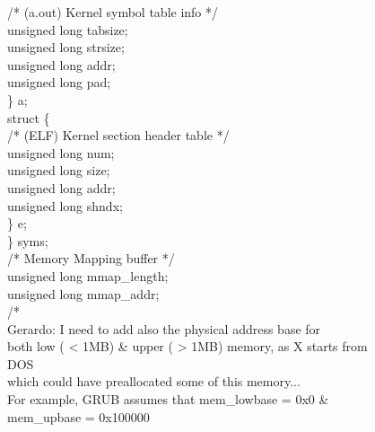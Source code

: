 \documentclass[a4paper]{report}
\begin{document}
\begin{figure}
\begin{tt}
\begin{tabbing}
/* (a.out) Kernel symbol table info */                                  \\
\>      \>      \>      unsigned long tabsize;                          \\
\>      \>      \>      unsigned long strsize;                          \\
\>      \>      \>      unsigned long addr;                             \\
\>      \>      \>      unsigned long pad;                              \\
\>      \>      \} a;                                                   \\
\>      \>      struct \{                                               \\
/* (ELF) Kernel section header table */                                 \\
\>      \>      \>      unsigned long num;                              \\
\>      \>      \>      unsigned long size;                             \\
\>      \>      \>      unsigned long addr;                             \\
\>      \>      \>      unsigned long shndx;                            \\
\>      \>      \} e;                                                   \\
\>      \} syms;                                                        \\
/* Memory Mapping buffer */                                             \\
\>      unsigned long mmap\_length;                                     \\
\>      unsigned long mmap\_addr;                                       \\
/*                                                                      \\
Gerardo: I need to add also the physical address base for               \\
both low ( < 1MB) \& upper ( > 1MB) memory, as X starts from DOS        \\
which could have preallocated some of this memory...                    \\
For example, GRUB assumes that mem\_lowbase = 0x0 \&                    \\
mem\_upbase = 0x100000                                                  \\

\end{tabbing}
\end{tt}
\end{figure}
\end{document}
